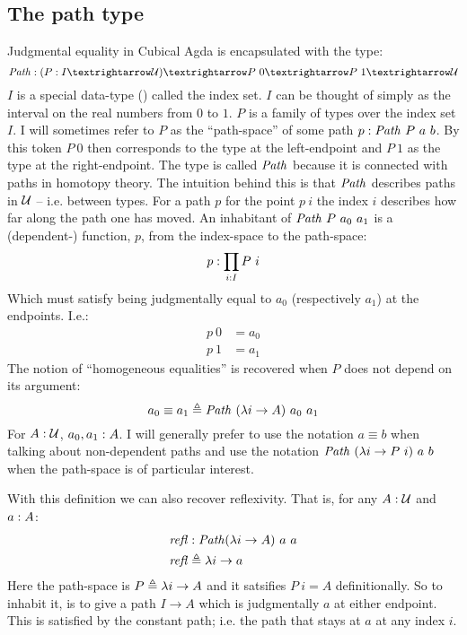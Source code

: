 \subsection{The path type}
Judgmental equality in Cubical Agda is encapsulated with the type:
%
\begin{equation}
\Path \tp (P \tp I → \MCU) → P\ 0 → P\ 1 → \MCU
\end{equation}
%
$I$ is a special data-type () called the index set. $I$ can be thought of simply as the interval on
the real numbers from $0$ to $1$. $P$ is a family of types over the index set
$I$. I will sometimes refer to $P$ as the ``path-space'' of some path $p \tp
\Path\ P\ a\ b$. By this token $P\ 0$ then corresponds to the type at the
left-endpoint and $P\ 1$ as the type at the right-endpoint. The type is called
$\Path$ because it is connected with paths in homotopy theory. The intuition
behind this is that $\Path$ describes paths in $\mathcal{U}$ -- i.e. between types. For
a path $p$ for the point $p\ i$ the index $i$ describes how far along the path
one has moved. An inhabitant of $\Path\ P\ a_0\ a_1$ is a (dependent-) function,
$p$, from the index-space to the path-space:
%
$$
p \mathrel{:} \prod_{i \mathrel{:} I} P\ i
$$
%
Which must satisfy being judgmentally equal to $a_0$ (respectively $a_1$) at the
endpoints. I.e.:
%
\begin{align*}
  p\ 0 & = a_0 \\
  p\ 1 & = a_1
\end{align*}
%
The notion of ``homogeneous equalities'' is recovered when $P$ does not depend
on its argument:
%
$$
a_0 \equiv a_1 \defeq \Path\ (\lambda i \to A)\ a_0\ a_1
$$
%
For $A \mathrel{:} \mathcal{U}$, $a_0, a_1 \mathrel{:} A$. I will generally prefer to use the notation
$a \equiv b$ when talking about non-dependent paths and use the notation
$\Path\ (\lambda i \to P\ i)\ a\ b$ when the path-space is of particular
interest.

With this definition we can also recover reflexivity. That is, for any $A \mathrel{:}
\mathcal{U}$ and $a \mathrel{:} A$:
%
\begin{equation}
\begin{aligned}
\refl & \tp \Path (\lambda i \to A)\ a\ a \\
\refl & \defeq \lambda i \to a
\end{aligned}
\end{equation}
%
Here the path-space is $P \mathrel{\triangleq} \lambda i \to A$ and it satsifies $P\ i = A$
definitionally. So to inhabit it, is to give a path $I \to A$ which is
judgmentally $a$ at either endpoint. This is satisfied by the constant path;
i.e. the path that stays at $a$ at any index $i$.

